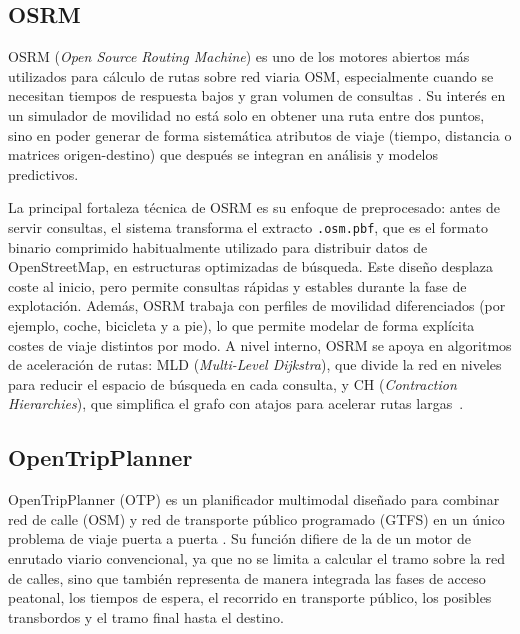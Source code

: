 \subsection{OSRM}

OSRM (\textit{Open Source Routing Machine}) es uno de los motores abiertos más utilizados para cálculo de rutas sobre red viaria OSM, especialmente cuando se necesitan tiempos de respuesta bajos y gran volumen de consultas \cite{OSRMDocs,OSRMGitHub}. Su interés en un simulador de movilidad no está solo en obtener una ruta entre dos puntos, sino en poder generar de forma sistemática atributos de viaje (tiempo, distancia o matrices origen-destino) que después se integran en análisis y modelos predictivos.

La principal fortaleza técnica de OSRM es su enfoque de preprocesado: antes de servir consultas, el sistema transforma el extracto \texttt{.osm.pbf}, que es el formato binario comprimido habitualmente utilizado para distribuir datos de OpenStreetMap, en estructuras optimizadas de búsqueda. Este diseño desplaza coste al inicio, pero permite consultas rápidas y estables durante la fase de explotación. Además, OSRM trabaja con perfiles de movilidad diferenciados (por ejemplo, coche, bicicleta y a pie), lo que permite modelar de forma explícita costes de viaje distintos por modo. A nivel interno, OSRM se apoya en algoritmos de aceleración de rutas: MLD (\textit{Multi-Level Dijkstra}), que divide la red en niveles para reducir el espacio de búsqueda en cada consulta, y CH (\textit{Contraction Hierarchies}), que simplifica el grafo con atajos para acelerar rutas largas~\cite{Delling2017CRP,Geisberger2008CH}.


\subsection{OpenTripPlanner}

OpenTripPlanner (OTP) es un planificador multimodal diseñado para combinar red de calle (OSM) y red de transporte público programado (GTFS) en un único problema de viaje puerta a puerta \cite{OTPDocs,OTPGitHub}. Su función difiere de la de un motor de enrutado viario convencional, ya que no se limita a calcular el tramo sobre la red de calles, sino que también representa de manera integrada las fases de acceso peatonal, los tiempos de espera, el recorrido en transporte público, los posibles transbordos y el tramo final hasta el destino.


